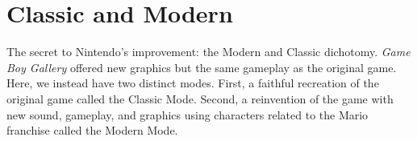 \documentclass{book}
\let\oldcenter\center
\let\oldendcenter\endcenter
\renewenvironment{center}{\setlength\topsep{0pt}\oldcenter}{\oldendcenter}
\begin{document}
\FloatBarrier\needspace{5pt}\section*{Classic and Modern}\nopagebreak[4]

The secret to Nintendo’s improvement: the Modern and Classic dichotomy. \emph{Game Boy Gallery} offered new graphics but the same gameplay as the original game. Here, we instead have two distinct modes. First, a faithful recreation of the original game called the Classic Mode. Second, a reinvention of the game with new sound, gameplay, and graphics using characters related to the Mario franchise called the Modern Mode.

\begin{center}
\vspace{8pt}
\quad\vspace{4pt}
\quad\vspace{4pt}
\quad\vspace{4pt}
\quad\vspace{4pt}

\end{center}
\end{document}
